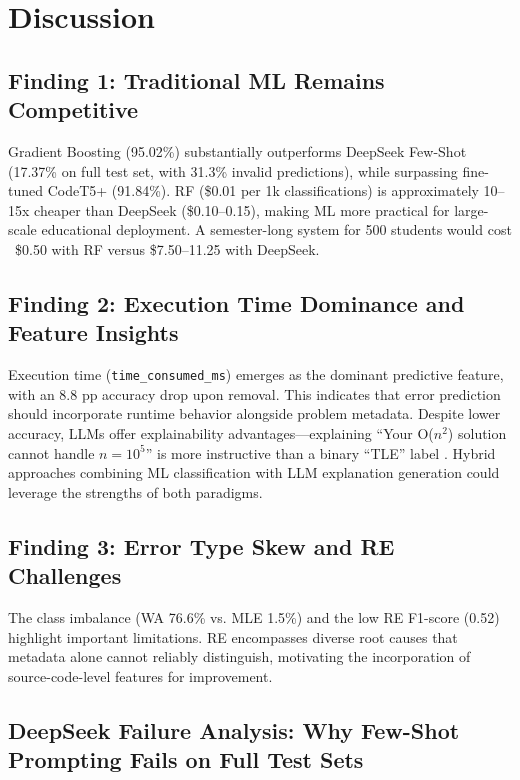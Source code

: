 \documentclass[10pt,letterpaper]{article}
\begin{document}
\section{Discussion}

\subsection{Finding 1: Traditional ML Remains Competitive}

Gradient Boosting (95.02\%) substantially outperforms DeepSeek Few-Shot (17.37\% on full test set, with 31.3\% invalid predictions), while surpassing fine-tuned CodeT5+ (91.84\%). RF (\$0.01 per 1k classifications) is approximately 10--15x cheaper than DeepSeek (\$0.10--0.15), making ML more practical for large-scale educational deployment. A semester-long system for 500 students would cost ~\$0.50 with RF versus \$7.50--11.25 with DeepSeek.

\subsection{Finding 2: Execution Time Dominance and Feature Insights}

Execution time (\texttt{time\_consumed\_ms}) emerges as the dominant predictive feature, with an 8.8 pp accuracy drop upon removal. This indicates that error prediction should incorporate runtime behavior alongside problem metadata. Despite lower accuracy, LLMs offer explainability advantages---explaining ``Your O($n^2$) solution cannot handle $n = 10^5$'' is more instructive than a binary ``TLE'' label \cite{finnie2022robots}. Hybrid approaches combining ML classification with LLM explanation generation could leverage the strengths of both paradigms.

\subsection{Finding 3: Error Type Skew and RE Challenges}

The class imbalance (WA 76.6\% vs. MLE 1.5\%) and the low RE F1-score (0.52) highlight important limitations. RE encompasses diverse root causes that metadata alone cannot reliably distinguish, motivating the incorporation of source-code-level features for improvement.

\subsection{DeepSeek Failure Analysis: Why Few-Shot Prompting Fails on Full Test Sets}
\end{document}
